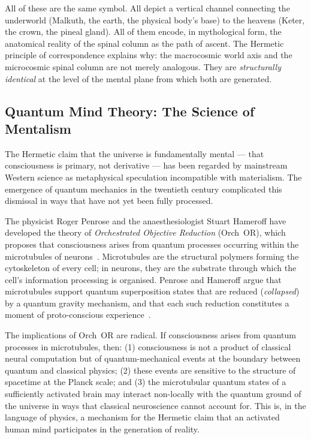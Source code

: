 \documentclass[12pt, a4paper]{article}
\begin{document}
All of these are the same symbol. All depict a vertical channel connecting
the underworld (Malkuth, the earth, the physical body's base) to the heavens
(Keter, the crown, the pineal gland). All of them encode, in mythological
form, the anatomical reality of the spinal column as the path of ascent. The
Hermetic principle of correspondence explains why: the macrocosmic world axis
and the microcosmic spinal column are not merely analogous. They are
\emph{structurally identical} at the level of the mental plane from which
both are generated.

\subsection{Quantum Mind Theory: The Science of Mentalism}

The Hermetic claim that the universe is fundamentally mental — that
consciousness is primary, not derivative — has been regarded by mainstream
Western science as metaphysical speculation incompatible with
materialism. The emergence of quantum mechanics in the twentieth century
complicated this dismissal in ways that have not yet been fully processed.

The physicist Roger Penrose and the anaesthesiologist Stuart Hameroff have
developed the theory of \emph{Orchestrated Objective Reduction} (Orch~OR),
which proposes that consciousness arises from quantum processes occurring
within the microtubules of neurons~\autocite{hameroff1996}. Microtubules are
the structural polymers forming the cytoskeleton of every cell; in neurons,
they are the substrate through which the cell's information processing is
organised. Penrose and Hameroff argue that microtubules support quantum
superposition states that are reduced (\emph{collapsed}) by a quantum gravity
mechanism, and that each such reduction constitutes a moment of proto-conscious
experience~\autocite{hameroff2014}.

The implications of Orch~OR are radical. If consciousness arises from quantum
processes in microtubules, then: (1) consciousness is not a product of
classical neural computation but of quantum-mechanical events at the boundary
between quantum and classical physics; (2) these events are sensitive to the
structure of spacetime at the Planck scale; and (3) the microtubular
quantum states of a sufficiently activated brain may interact non-locally with
the quantum ground of the universe in ways that classical neuroscience cannot
account for. This is, in the language of physics, a mechanism for the
Hermetic claim that an activated human mind participates in the generation of
reality.
\end{document}
